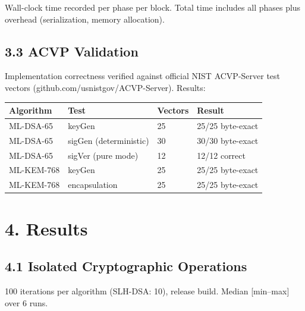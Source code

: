 \documentclass[
]{article}
\newcounter{none} %
\begin{document}
Wall-clock time recorded per phase per block. Total time includes all
phases plus overhead (serialization, memory allocation).

\subsection{3.3 ACVP Validation}\label{acvp-validation}

Implementation correctness verified against official NIST ACVP-Server
test vectors (github.com/usnistgov/ACVP-Server). Results:

{\def\LTcaptype{none} %
\begin{longtable}[]{@{}llll@{}}
\toprule\noalign{}
Algorithm & Test & Vectors & Result \\
\midrule\noalign{}
\endhead
\bottomrule\noalign{}
\endlastfoot
ML-DSA-65 & keyGen & 25 & 25/25 byte-exact \\
ML-DSA-65 & sigGen (deterministic) & 30 & 30/30 byte-exact \\
ML-DSA-65 & sigVer (pure mode) & 12 & 12/12 correct \\
ML-KEM-768 & keyGen & 25 & 25/25 byte-exact \\
ML-KEM-768 & encapsulation & 25 & 25/25 byte-exact \\
\end{longtable}
}

\section{4. Results}\label{results}

\subsection{4.1 Isolated Cryptographic
Operations}\label{isolated-cryptographic-operations}

100 iterations per algorithm (SLH-DSA: 10), release build. Median
{[}min--max{]} over 6 runs.
\end{document}
